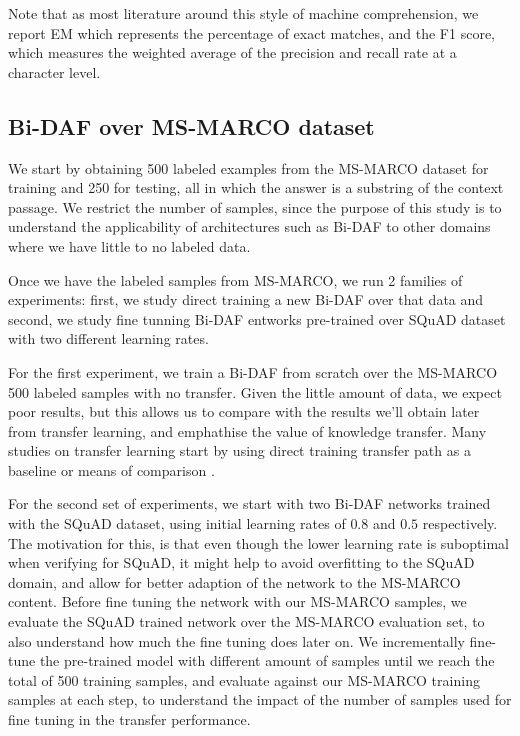 \documentclass[11pt,a4paper]{article}
\begin{document}
Note that as most literature around this style of machine comprehension, we report EM which represents the percentage of exact matches, and the F1 score, which measures the weighted average of the precision and recall rate at a character level.

\subsection{Bi-DAF over MS-MARCO dataset}

We start by obtaining 500 labeled examples from the MS-MARCO dataset for training and 250 for testing, all in which the answer is a substring of the context passage. We restrict the number of samples, since the purpose of this study is to understand the applicability of architectures such as Bi-DAF to other domains where we have little to no labeled data.

Once we have the labeled samples from MS-MARCO, we run 2 families of experiments: first, we study direct training a new Bi-DAF over that data and second, we study fine tunning Bi-DAF entworks pre-trained over SQuAD dataset with two different learning rates.

For the first experiment, we train a Bi-DAF from scratch over the MS-MARCO 500 labeled samples with no transfer. Given the little amount of data, we expect poor results, but this allows us to compare with the results we'll obtain later from transfer learning, and emphathise the value of knowledge transfer. Many studies on transfer learning start by using direct training transfer path as a baseline or means of comparison \cite{conneau:2017}.

For the second set of experiments, we start with two Bi-DAF networks trained with the SQuAD dataset, using initial learning rates of $0.8$ and $0.5$ respectively. The motivation for this, is that even though the lower learning rate is suboptimal when verifying for SQuAD, it might help to avoid overfitting to the SQuAD domain, and allow for better adaption of the network to the MS-MARCO content. Before fine tuning the network with our MS-MARCO samples, we evaluate the SQuAD trained network over the MS-MARCO evaluation set, to also understand how much the fine tuning does later on. We incrementally fine-tune the pre-trained model with different amount of samples until we reach the total of 500 training samples, and evaluate against our MS-MARCO training samples at each step, to understand the impact of the number of samples used for fine tuning in the transfer performance. 
\end{document}
